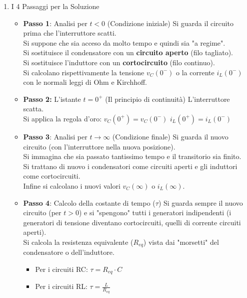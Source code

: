 \documentclass[../main.tex]{subfiles}
\begin{document}
\begin{enumerate}
\begin{itemize}
				\item $\tau$ (tau) è la costante di tempo del circuito
			\end{itemize}
		\item I 4 Passaggi per la Soluzione
			\begin{itemize}
				\item \textbf{Passo 1}: Analisi per $t < 0$ (Condizione iniziale)
					Si guarda il circuito prima che l'interruttore scatti. \\
					Si suppone che sia acceso da molto tempo e quindi sia "a regime".\\
					Si sostituisce il condensatore con un \textbf{circuito aperto} (filo tagliato).\\
					Si sostituisce l'induttore con un \textbf{cortocircuito} (filo continuo).\\
					Si calcolano rispettivamente la tensione $v_C(0^-)$ o la corrente $i_L(0^-)$ con le normali leggi di Ohm e Kirchhoff.
				\item \textbf{Passo 2:} L'istante $t = 0^+$ (Il principio di continuità)
					L'interruttore scatta. \\
					Si applica la regola d'oro:
					$v_C(0^+) = v_C(0^-)$
					$i_L(0^+) = i_L(0^-)$
				\item \textbf{Passo 3}: Analisi per $t \to \infty$ (Condizione finale)
					Si guarda il nuovo circuito (con l'interruttore nella nuova posizione). \\
					Si immagina che sia passato tantissimo tempo e il transitorio sia finito.\\
					Si trattano di nuovo i condensatori come circuiti aperti e gli induttori come cortocircuiti.\\
					Infine si calcolano i nuovi valori $v_C(\infty)$ o $i_L(\infty)$.\\
				\item \textbf{Passo 4}: Calcolo della costante di tempo ($\tau$)
					Si guarda sempre il nuovo circuito (per $t > 0$) e si "spengono" tutti i generatori indipendenti (i generatori di tensione diventano cortocircuiti, quelli di corrente circuiti aperti).\\
					Si calcola la resistenza equivalente ($R_{eq}$) vista dai "morsetti" del condensatore o dell'induttore.
					\begin{itemize}
						\item Per i circuiti RC: $\boxed{\tau = R_{eq} \cdot C}$
						\item Per i circuiti RL: $\boxed{\tau = \frac{L}{R_{eq}}}$
					\end{itemize}

\end{itemize}
\end{enumerate}
\end{document}
